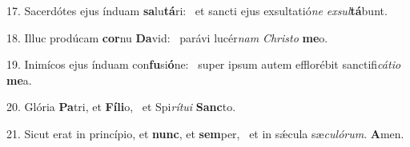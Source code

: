 17. Sacerdótes ejus índuam \textbf{sa}lu\textbf{tá}ri: \ast\  et sancti ejus exsultatió\textit{ne} \textit{ex}\textit{sul}\textbf{tá}bunt.\

18. Illuc prodúcam \textbf{cor}nu \textbf{Da}vid: \ast\  parávi lucér\textit{nam} \textit{Chris}\textit{to} \textbf{me}o.\

19. Inimícos ejus índuam con\textbf{fu}si\textbf{ó}ne: \ast\  super ipsum autem efflorébit sanctifi\textit{cá}\textit{ti}\textit{o} \textbf{me}a.\

20. Glória \textbf{Pa}tri, et \textbf{Fí}\textbf{li}o, \ast\  et Spi\textit{rí}\textit{tu}\textit{i} \textbf{Sanc}to.\

21. Sicut erat in princípio, et \textbf{nunc}, et \textbf{sem}per, \ast\  et in sǽcula sæ\textit{cu}\textit{ló}\textit{rum}. \textbf{A}men.\

